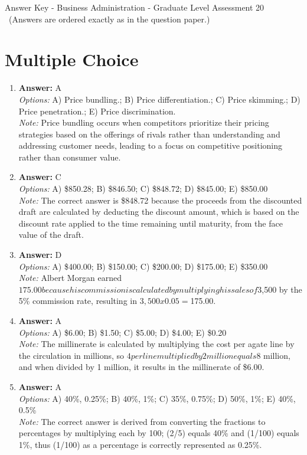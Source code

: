 \documentclass[12pt]{article}
\begin{document}
\begin{center}
Answer Key - Business Administration - Graduate Level Assessment 20 \
\small (Answers are ordered exactly as in the question paper.)
\end{center}

\section*{Multiple Choice}
\begin{enumerate}[label=\arabic*.]
\item \textbf{Answer:} A
\\ \textit{Options:} A) Price bundling.; B) Price differentiation.; C) Price skimming.; D) Price penetration.; E) Price discrimination.
\\ \textit{Note:} Price bundling occurs when competitors prioritize their pricing strategies based on the offerings of rivals rather than understanding and addressing customer needs, leading to a focus on competitive positioning rather than consumer value.
\item \textbf{Answer:} C
\\ \textit{Options:} A) \$850.28; B) \$846.50; C) \$848.72; D) \$845.00; E) \$850.00
\\ \textit{Note:} The correct answer is \$848.72 because the proceeds from the discounted draft are calculated by deducting the discount amount, which is based on the discount rate applied to the time remaining until maturity, from the face value of the draft.
\item \textbf{Answer:} D
\\ \textit{Options:} A) \$400.00; B) \$150.00; C) \$200.00; D) \$175.00; E) \$350.00
\\ \textit{Note:} Albert Morgan earned $175.00 because his commission is calculated by multiplying his sales of $3,500 by the 5\% commission rate, resulting in $3,500 x 0.05 = $175.00.
\item \textbf{Answer:} A
\\ \textit{Options:} A) \$6.00; B) \$1.50; C) \$5.00; D) \$4.00; E) \$0.20
\\ \textit{Note:} The millinerate is calculated by multiplying the cost per agate line by the circulation in millions, so $4 per line multiplied by 2 million equals $8 million, and when divided by 1 million, it results in the millinerate of \$6.00.
\item \textbf{Answer:} A
\\ \textit{Options:} A) 40\%, 0.25\%; B) 40\%, 1\%; C) 35\%, 0.75\%; D) 50\%, 1\%; E) 40\%, 0.5\%
\\ \textit{Note:} The correct answer is derived from converting the fractions to percentages by multiplying each by 100; (2/5) equals 40\% and (1/100) equals 1\%, thus (1/100) as a percentage is correctly represented as 0.25\%.
\end{enumerate}
\end{document}
